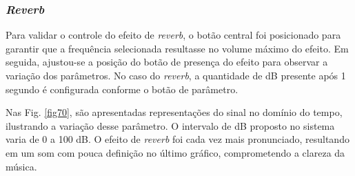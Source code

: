 





\subsubsection*{\textit{Reverb}}

Para validar o controle do efeito de \textit{reverb}, o botão central foi posicionado para garantir que a frequência selecionada resultasse no volume máximo do efeito. Em seguida, ajustou-se a posição do botão de presença do efeito para observar a variação dos parâmetros. No caso do \textit{reverb}, a quantidade de dB presente após 1 segundo é configurada conforme o botão de parâmetro.

Nas Fig. \ref{fig70}, são apresentadas representações do sinal no domínio do tempo, ilustrando a variação desse parâmetro. O intervalo de dB proposto no sistema varia de 0 a 100 dB. O efeito de \textit{reverb} foi cada vez mais pronunciado, resultando em um som com pouca definição no último gráfico, comprometendo a clareza da música.


